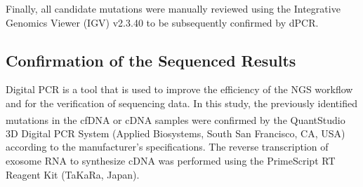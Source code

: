 Finally, all candidate mutations were manually reviewed using the Integrative Genomics Viewer (IGV) v2.3.40 to be subsequently confirmed by dPCR.

\subsection{Confirmation of the Sequenced Results}

Digital PCR is a tool that is used to improve the efficiency of the NGS workflow and for the verification of sequencing data. In this study, the previously identified mutations in the cfDNA or cDNA samples were confirmed by the QuantStudio\textsuperscript\textregistered{} 3D Digital PCR System (Applied Biosystems, South San Francisco, CA, USA) according to the manufacturer's specifications. The reverse transcription of exosome RNA to synthesize cDNA was performed using the PrimeScript\texttrademark{} RT Reagent Kit (TaKaRa, Japan).

